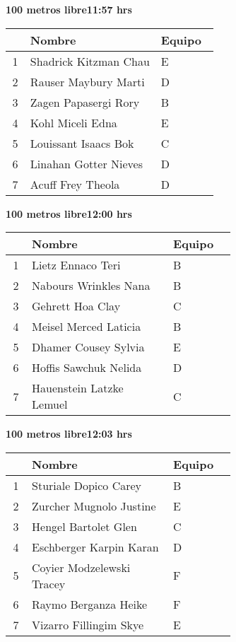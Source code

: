 \begin{minipage}{0.95\linewidth}
\begin{center}
\textbf{
100 metros libre\hspace{1cm}11:57 hrs}
\end{center}
\begin{tabular}{cp{0.63\linewidth}l}
\hline
& \textbf{Nombre} & \textbf{Equipo} \\ \hline
1 & Shadrick Kitzman Chau & E \\ 
2 & Rauser Maybury Marti & D \\ 
3 & Zagen Papasergi Rory & B \\ 
4 & Kohl Miceli Edna & E \\ 
5 & Louissant Isaacs Bok & C \\ 
6 & Linahan Gotter Nieves & D \\ 
7 & Acuff Frey Theola & D \\ 
\end{tabular}
\end{minipage}
\begin{minipage}{0.95\linewidth}
\begin{center}
\textbf{
100 metros libre\hspace{1cm}12:00 hrs}
\end{center}
\begin{tabular}{cp{0.63\linewidth}l}
\hline
& \textbf{Nombre} & \textbf{Equipo} \\ \hline
1 & Lietz Ennaco Teri & B \\ 
2 & Nabours Wrinkles Nana & B \\ 
3 & Gehrett Hoa Clay & C \\ 
4 & Meisel Merced Laticia & B \\ 
5 & Dhamer Cousey Sylvia & E \\ 
6 & Hoffis Sawchuk Nelida & D \\ 
7 & Hauenstein Latzke Lemuel & C \\ 
\end{tabular}
\end{minipage}
\begin{minipage}{0.95\linewidth}
\begin{center}
\textbf{
100 metros libre\hspace{1cm}12:03 hrs}
\end{center}
\begin{tabular}{cp{0.63\linewidth}l}
\hline
& \textbf{Nombre} & \textbf{Equipo} \\ \hline
1 & Sturiale Dopico Carey & B \\ 
2 & Zurcher Mugnolo Justine & E \\ 
3 & Hengel Bartolet Glen & C \\ 
4 & Eschberger Karpin Karan & D \\ 
5 & Coyier Modzelewski Tracey & F \\ 
6 & Raymo Berganza Heike & F \\ 
7 & Vizarro Fillingim Skye & E \\ 
\end{tabular}
\end{minipage}
